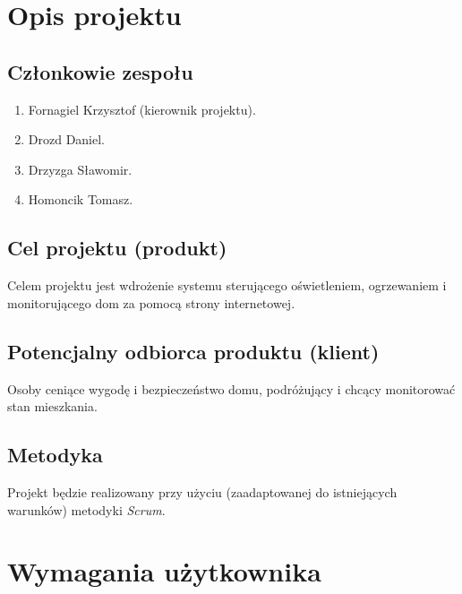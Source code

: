 	\newpage
	
	\section{Opis projektu}
	
	\subsection{Członkowie zespołu}
	
	\begin{enumerate}
		\item Fornagiel Krzysztof (kierownik projektu).
		\item Drozd Daniel.
		\item Drzyzga Sławomir.
		\item Homoncik Tomasz.
	\end{enumerate}
	
	\subsection{Cel projektu (produkt)}
	Celem projektu jest wdrożenie systemu sterującego oświetleniem, ogrzewaniem i monitorującego dom za pomocą strony internetowej.
	
	\subsection{Potencjalny odbiorca produktu (klient)}
	Osoby ceniące wygodę i bezpieczeństwo domu, podróżujący i chcący monitorować stan mieszkania.
	
	
	\subsection{Metodyka}
	
	Projekt będzie realizowany przy użyciu (zaadaptowanej do istniejących warunków) metodyki {\em Scrum}. 
	
	\section{Wymagania użytkownika}
	
